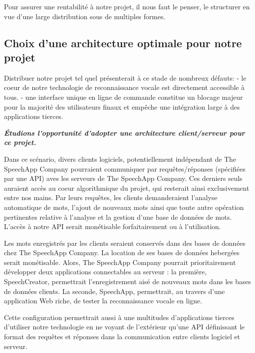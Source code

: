\documentclass[a4paper,12pt]{report}
\begin{document}
Pour assurer une rentabilité à notre projet, il nous faut le penser, le structurer en vue d'une large distribution sous de multiples formes.


\subsection{Choix d'une architecture optimale pour notre projet}

Distribuer notre projet tel quel présenterait à ce stade de nombreux défauts:
- le coeur de notre technologie de reconnaissance vocale est directement accessible à tous.
- une interface unique en ligne de commande constitue un blocage majeur pour la majorité des utilisateurs finaux et empêche une intégration large à des applications tierces.

\bigskip

\textbf{\emph{Étudions l'opportunité d'adopter une architecture client/serveur pour ce projet.}}

\bigskip

Dans ce scénario, divers clients logiciels, potentiellement indépendant de The SpeechApp Company pourraient communiquer par requêtes/réponses (spécifiées par une API) aves les serveurs de The SpeechApp Company. Ces derniers seuls auraient accès au coeur algorithmique du projet, qui resterait ainsi exclusivement entre nos mains. Par leurs requêtes, les clients demanderaient l'analyse automatique de mots, l'ajout de nouveaux mots ainsi que toute autre opération pertinentes relative à l'analyse et la gestion d'une base de données de mots. L'accès à notre API serait monétisable forfaitairement ou à l'utilisation.

\medskip

Les mots enregistrés par les clients seraient conservés dans des bases de données chez The SpeechApp Company. La location de ses bases de données hebergées serait monétisable.
Alors, The SpeechApp Company pourrait prioritairement développer deux applications connectables au serveur : la première, SpeechCreator, permettrait l'enregistrement aisé de nouveaux mots dans les bases de données clients. La seconde, SpeechApp, permettrait, au travers d'une application Web riche, de tester la reconnaissance vocale en ligne.

\medskip

Cette configuration permettrait aussi à une multitudes d'applications tierces d'utiliser notre technologie en ne voyant de l'extérieur qu'une API définissant le format des requêtes et réponses dans la communication entre clients logiciel et serveur.
\end{document}
